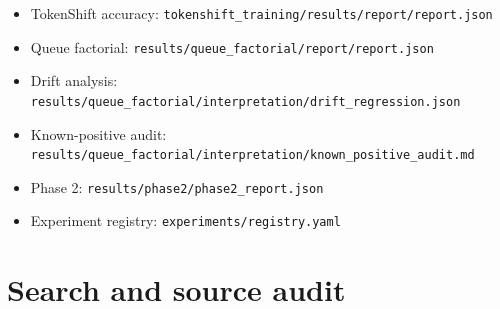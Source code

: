 \begin{itemize}
\item TokenShift accuracy: \texttt{tokenshift\_\linebreak[1]training/\linebreak[1]results/\linebreak[1]report/\linebreak[1]report.\linebreak[1]json}
\item Queue factorial: \texttt{results/\linebreak[1]queue\_\linebreak[1]factorial/\linebreak[1]report/\linebreak[1]report.\linebreak[1]json}
\item Drift analysis: \texttt{results/\linebreak[1]queue\_\linebreak[1]factorial/\linebreak[1]interpretation/\linebreak[1]drift\_\linebreak[1]regression.\linebreak[1]json}
\item Known-positive audit: \texttt{results/\linebreak[1]queue\_\linebreak[1]factorial/\linebreak[1]interpretation/\linebreak[1]known\_\linebreak[1]positive\_\linebreak[1]audit.\linebreak[1]md}
\item Phase 2: \texttt{results/\linebreak[1]phase2/\linebreak[1]phase2\_\linebreak[1]report.\linebreak[1]json}
\item Experiment registry: \texttt{experiments/\linebreak[1]registry.\linebreak[1]yaml}
\end{itemize}

\chapter{Search and source audit}

